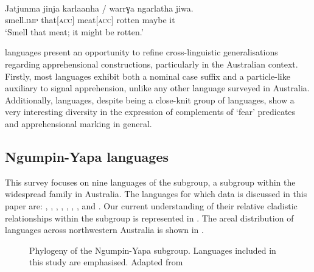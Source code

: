 \documentclass[output=paper,colorlinks,citecolor=brown]{langscibook}
\begin{document}
\ea
{} {\citealt[234]{breen_description_1970}} \\
\gll Jatjunma jinja {karlaanha \textnormal{/}} warrɣa ngarlatha jiwa. \\
smell.\textsc{imp} that[\textsc{acc}] meat[\textsc{acc}] rotten maybe it \\
\glt `Smell that meat; it might be rotten.'
\label{ex:bro13}
\z

  languages present an opportunity to refine cross-linguistic generalisations regarding apprehensional constructions, particularly in the Australian context. Firstly, most  languages exhibit both a nominal case suffix and a particle-like auxiliary to signal apprehension, unlike any other language surveyed in Australia. Additionally,  languages, despite being a close-knit group of languages, show a very interesting diversity in the expression of complements of `fear' predicates and apprehensional marking in general.

\subsection{Ngumpin-Yapa languages}
\label{subsec:NYlangs}

This survey focuses on nine languages of the  subgroup, a subgroup within the widespread  family in Australia. The languages for which data is discussed in this paper are: , , , , , , ,  and . Our current understanding of their relative cladistic relationships within the  subgroup is represented in . The areal distribution of  languages across northwestern Australia is shown in .


\begin{figure}[p]
\small
{}
    \caption{Phylogeny of the Ngumpin-Yapa subgroup. Languages included in this study are emphasised. Adapted from \citet[791]{mcconvell_loanwords_2009}}
    \label{fig2}
\end{figure}
\end{document}
